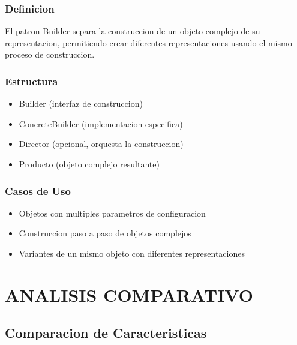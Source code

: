 \documentclass[11pt,a4paper]{article}
\begin{document}
\subsubsection{Definicion}

El patron Builder separa la construccion de un objeto complejo de su representacion, permitiendo crear diferentes representaciones usando el mismo proceso de construccion.

\subsubsection{Estructura}

\begin{itemize}
    \item Builder (interfaz de construccion)
    \item ConcreteBuilder (implementacion especifica)
    \item Director (opcional, orquesta la construccion)
    \item Producto (objeto complejo resultante)
\end{itemize}

\subsubsection{Casos de Uso}

\begin{itemize}
    \item Objetos con multiples parametros de configuracion
    \item Construccion paso a paso de objetos complejos
    \item Variantes de un mismo objeto con diferentes representaciones
\end{itemize}

\section{ANALISIS COMPARATIVO}

\subsection{Comparacion de Caracteristicas}
\end{document}
